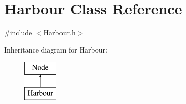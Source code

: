\hypertarget{class_harbour}{}\section{Harbour Class Reference}
\label{class_harbour}


{\ttfamily \#include $<$Harbour.\+h$>$}

Inheritance diagram for Harbour\+:\begin{figure}[H]
\begin{center}
\leavevmode
\includegraphics[height=2.000000cm]{d1/dc2/class_harbour}
\end{center}
\end{figure}
